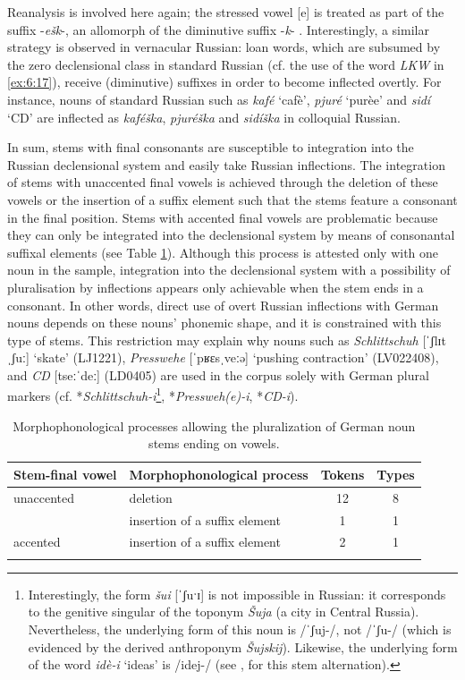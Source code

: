 \noindent Reanalysis is involved here again; the stressed vowel [e] is treated as part of the suffix -\textit{ešk}-, an allomorph of the diminutive suffix -\textit{k}- \citep[2010]{rusgramm-tom1}. Interestingly, a similar strategy is observed in vernacular Russian: loan words, which are subsumed by  the zero declensional class in standard Russian (cf. the use of the word \textit{LKW} in \ref{ex:6:17}), receive (diminutive) suffixes in order to become inflected overtly. For instance, nouns of standard Russian such as \textit{kafé} `cafè', \textit{pjuré} `purèe' and \textit{sidí} ‘CD’ are inflected as \textit{kaféška}, \textit{pjuréška} and \textit{sidíška} in colloquial Russian. 

In sum, stems with final consonants are susceptible to integration into the Russian declensional system and easily take Russian inflections. The integration of stems with unaccented final vowels is achieved through the deletion of these vowels or the insertion of a suffix element such that the stems feature a consonant in the final position. Stems with accented final vowels are problematic because they can only be integrated into the declensional system by means of consonantal suffixal elements (see Table \ref{tab:6:4}). Although this process is attested only with one noun in the sample, integration into the declensional system with a possibility of pluralisation by inflections appears only achievable when the stem ends in a consonant. In other words, direct use of overt Russian inflections with German nouns depends on these nouns’ phonemic shape, and it is constrained with this type of stems. This restriction may explain why nouns such as \textit{Schlittschuh} [ˈʃlɪtˌʃuː] `skate' (LJ1221), \textit{Presswehe} [ˈpʁɛsˌveːə] `pushing contraction' (LV022408), and \textit{CD} [tseːˈdeː] (LD0405) are used in the corpus solely with German plural markers (cf. *\textit{Schlittschuh-i}\footnote{Interestingly, the form \textit{šui} [ˈʃuˑɪ] is not impossible in Russian: it corresponds to the genitive singular of the toponym \textit{Šuja} (a city in Central Russia). Nevertheless, the underlying form of this noun is /ˈʃuj-/, not /ˈʃu-/ (which is evidenced by the derived anthroponym \textit{Šujskij}). Likewise, the underlying form of the word \textit{idè-i} `ideas' is /idej-/ (see \citealt[246]{itkin_2007}, for this stem alternation).}, *\textit{Pressweh(e)-i}, *\textit{CD-i}).

\begin{table}
\begin{tabular}{ll cc}
\lsptoprule
	Stem-final vowel & Morphophonological process & Tokens & Types\\\midrule
	unaccented & deletion & 12 & 8\\
               & insertion of a suffix element & 1 & 1\\ \midrule
	accented   & insertion of a suffix element & 2 & 1\\ 
\lspbottomrule
\end{tabular}
	\caption{Morphophonological processes allowing the pluralization of German noun stems ending on vowels.\label{tab:6:4}}
\end{table}

